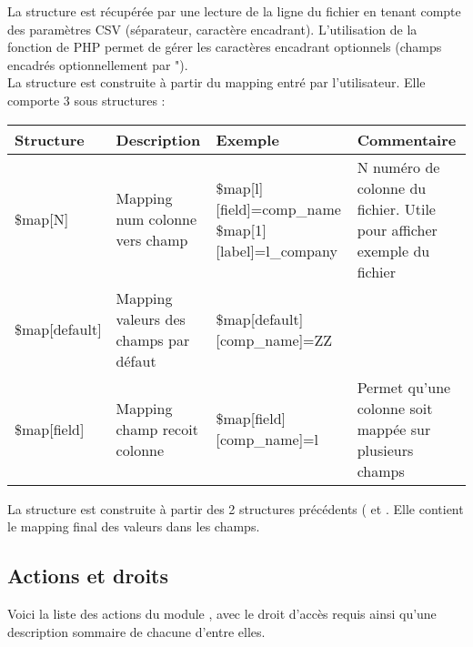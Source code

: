 \vspace{0.3cm}
La structure  est récupérée par une lecture de la ligne du fichier en tenant compte des paramètres CSV (séparateur, caractère encadrant).
L'utilisation de la fonction  de PHP permet de gérer les caractères encadrant optionnels (champs encadrés optionnellement par ").\\

La structure  est construite à partir du mapping entré par l'utilisateur.
Elle comporte 3 sous structures :\\

\begin{tabular}{|p{2cm}|p{3.2cm}|p{4.8cm}|p{3.8cm}|}
\hline
\textbf{Structure} & \textbf{Description} & \textbf{Exemple} & \textbf{Commentaire}\\
\hline
\$map[N] & Mapping num colonne vers champ & \$map[l][field]=comp\_name \$map[1][label]=l\_company & N numéro de colonne du fichier. Utile pour afficher exemple du fichier \\
\hline
\$map[default] & Mapping valeurs des champs par défaut & \$map[default][comp\_name]=ZZ & \\
\hline
\$map[field] & Mapping champ recoit colonne & \$map[field][comp\_name]=l & Permet qu'une colonne soit mappée sur plusieurs champs\\
\hline
\end{tabular}

\vspace{0.3cm}
La structure  est construite à partir des 2 structures précédents ( et . Elle contient le mapping final des valeurs dans les champs.


\subsection{Actions et droits}

Voici la liste des actions du module , avec le droit d'accès requis ainsi qu'une description sommaire de chacune d'entre elles.\\

